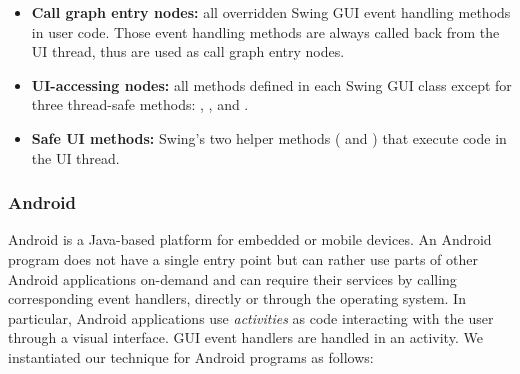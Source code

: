 \begin{itemize}

\item \textbf{Call graph entry nodes:} all overridden Swing GUI event handling
methods in user code. Those event handling methods are always
called back from the UI thread, thus are used as call graph entry nodes.

\item \textbf{UI-accessing nodes:} %
all methods defined in each Swing GUI class except for three thread-safe
methods: , , and .


\item \textbf{Safe UI methods: }  Swing's two helper methods
(  and ) that execute code in the UI thread.

\end{itemize}

\subsubsection{Android}

Android is a Java-based platform for embedded or mobile devices. 
An Android program does not have a single entry point but can
rather use parts of other Android applications on-demand and can require their
services by calling corresponding event handlers, directly or through the
operating system. In particular, Android applications use \textit{activities}
as code interacting with the user through a visual interface. GUI event handlers
are handled in an activity.
We instantiated our technique for Android programs as follows:



